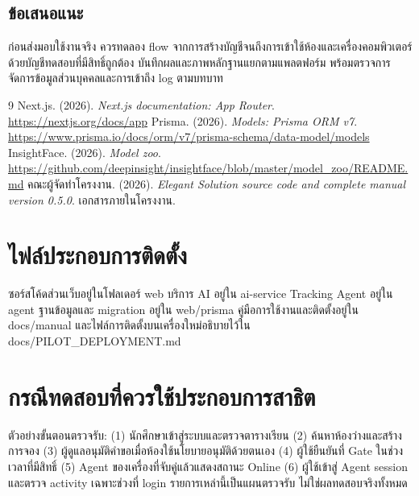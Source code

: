 \documentclass[14pt,a4paper,oneside]{extreport}
\begin{document}
\section{ข้อเสนอแนะ}
ก่อนส่งมอบใช้งานจริง ควรทดลอง flow จากการสร้างบัญชีจนถึงการเข้าใช้ห้องและเครื่องคอมพิวเตอร์ด้วยบัญชีทดสอบที่มีสิทธิ์ถูกต้อง บันทึกผลและภาพหลักฐานแยกตามแพลตฟอร์ม พร้อมตรวจการจัดการข้อมูลส่วนบุคคลและการเข้าถึง log ตามบทบาท

\begin{thebibliography}{9}
 Next.js. (2026). \textit{Next.js documentation: App Router}. \url{https://nextjs.org/docs/app}
 Prisma. (2026). \textit{Models: Prisma ORM v7}. \url{https://www.prisma.io/docs/orm/v7/prisma-schema/data-model/models}
 InsightFace. (2026). \textit{Model zoo}. \url{https://github.com/deepinsight/insightface/blob/master/model_zoo/README.md}
 คณะผู้จัดทำโครงงาน. (2026). \textit{Elegant Solution source code and complete manual version 0.5.0}. เอกสารภายในโครงงาน.
\end{thebibliography}

\appendix
\renewcommand{\appendixname}{ภาคผนวก}
\chapter{ไฟล์ประกอบการติดตั้ง}
ซอร์สโค้ดส่วนเว็บอยู่ในโฟลเดอร์ web บริการ AI อยู่ใน ai-service Tracking Agent อยู่ใน agent ฐานข้อมูลและ migration อยู่ใน web/prisma คู่มือการใช้งานและติดตั้งอยู่ใน docs/manual และไฟล์การติดตั้งบนเครื่องใหม่อธิบายไว้ใน docs/PILOT\_DEPLOYMENT.md
\chapter{กรณีทดสอบที่ควรใช้ประกอบการสาธิต}
ตัวอย่างขั้นตอนตรวจรับ: (1) นักศึกษาเข้าสู่ระบบและตรวจตารางเรียน (2) ค้นหาห้องว่างและสร้างการจอง (3) ผู้ดูแลอนุมัติคำขอเมื่อห้องใช้นโยบายอนุมัติด้วยตนเอง (4) ผู้ใช้ยืนยันที่ Gate ในช่วงเวลาที่มีสิทธิ์ (5) Agent ของเครื่องที่จับคู่แล้วแสดงสถานะ Online (6) ผู้ใช้เข้าสู่ Agent session และตรวจ activity เฉพาะช่วงที่ login รายการเหล่านี้เป็นแผนตรวจรับ ไม่ใช่ผลทดสอบจริงทั้งหมด
\end{document}
